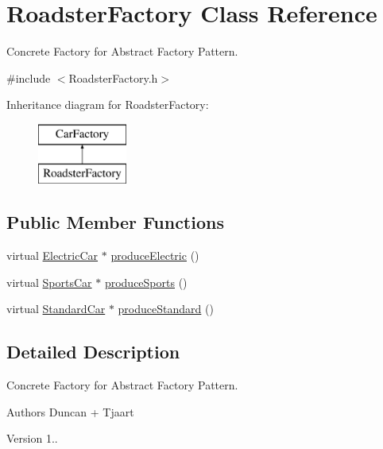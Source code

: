 \hypertarget{class_roadster_factory}{}\section{Roadster\+Factory Class Reference}
\label{class_roadster_factory}


Concrete Factory for Abstract Factory Pattern.  




{\ttfamily \#include $<$Roadster\+Factory.\+h$>$}

Inheritance diagram for Roadster\+Factory\+:\begin{figure}[H]
\begin{center}
\leavevmode
\includegraphics[height=2.000000cm]{class_roadster_factory}
\end{center}
\end{figure}
\subsection*{Public Member Functions}
\begin{DoxyCompactItemize}
\item 
virtual \mbox{\hyperlink{class_electric_car}{Electric\+Car}} $\ast$ \mbox{\hyperlink{class_roadster_factory_abb3e30ce51a09d04e72af473f2899774}{produce\+Electric}} ()
\item 
virtual \mbox{\hyperlink{class_sports_car}{Sports\+Car}} $\ast$ \mbox{\hyperlink{class_roadster_factory_a0de9b71d1c2c6e2ffd39a6c8a43dfc57}{produce\+Sports}} ()
\item 
virtual \mbox{\hyperlink{class_standard_car}{Standard\+Car}} $\ast$ \mbox{\hyperlink{class_roadster_factory_a127974ae0ff6bdabdf628b920ee2e518}{produce\+Standard}} ()
\end{DoxyCompactItemize}


\subsection{Detailed Description}
Concrete Factory for Abstract Factory Pattern. 

\begin{DoxyAuthor}{Authors}
Duncan + Tjaart 
\end{DoxyAuthor}
\begin{DoxyVersion}{Version}
1.. 
\end{DoxyVersion}


